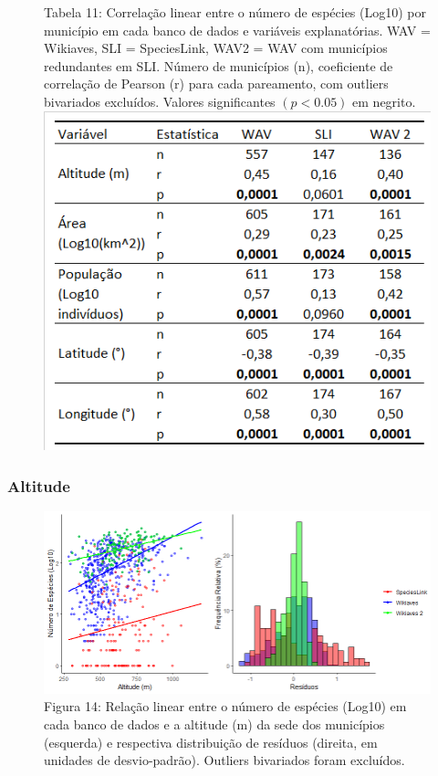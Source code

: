 \newpage

\begin{figure}[h!]
\centering
{\scriptsize Tabela 11: Correlação linear entre o número de espécies (Log10) por município em cada banco de dados e variáveis explanatórias. WAV = Wikiaves, SLI = SpeciesLink, WAV2 = WAV com municípios redundantes em SLI. Número de municípios (n), coeficiente de correlação de Pearson (r) para cada pareamento, com outliers bivariados excluídos. Valores significantes $(p < 0.05)$ em negrito.}
\\
\includegraphics{Imagens/T11.png}
\end{figure}

\subsubsection{Altitude}


 

\begin{figure}[h!]
\centering
\includegraphics[width = 15cm]{Imagens/G06.png}
\\{\scriptsize Figura 14: Relação linear entre o número de espécies (Log10) em cada banco de dados e a altitude (m) da sede dos municípios (esquerda) e respectiva distribuição de resíduos (direita, em unidades de desvio-padrão). Outliers bivariados foram excluídos.}
\end{figure}


